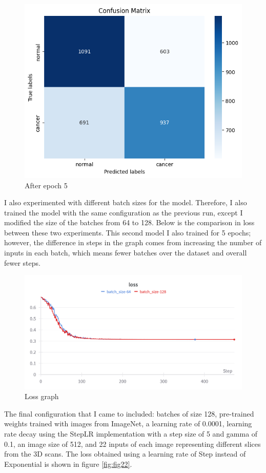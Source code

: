 \begin{figure}[ht!]
    \centering
    \includegraphics[width=0.5\linewidth]{figures/Figure21.png}
    \caption{After epoch 5}
    \label{fig:fig20}
\end{figure}
I also experimented with different batch sizes for the model. Therefore, I also trained the model with the same configuration as the previous run, except I modified the size of the batches from 64 to 128. Below is the comparison in loss between these two experiments. This second model I also trained for 5 epochs; however, the difference in steps in the graph comes from increasing the number of inputs in each batch, which means fewer batches over the dataset and overall fewer steps.\\
\begin{figure}[ht!]
    \centering
    \includegraphics[width=1\linewidth]{figures/Figure22.png}
    \caption{Loss graph}
    \label{fig:fig21}
\end{figure}
The final configuration that I came to included: batches of size 128, pre-trained weights trained with images from ImageNet, a learning rate of 0.0001, learning rate decay using the StepLR implementation with a step size of 5 and gamma of 0.1, an image size of 512, and 22 inputs of each image representing different slices from the 3D scans. The loss obtained using a learning rate of Step instead of Exponential is shown in figure \ref{fig:fig22}.\\
